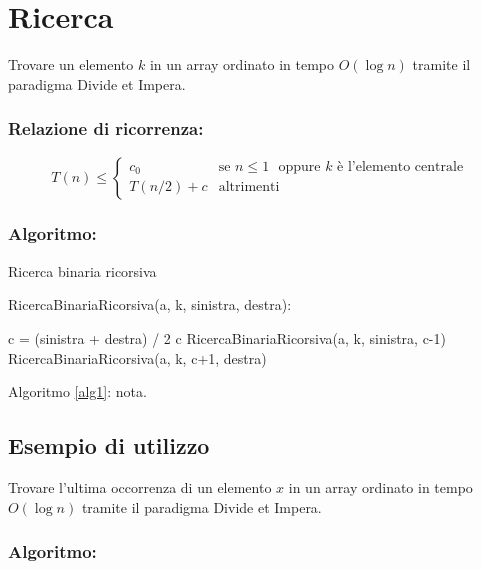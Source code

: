 \section{Ricerca}
Trovare un elemento $k$ in un array 
ordinato in tempo $O(\log n)$ tramite il paradigma Divide et Impera.

\subsubsection*{Relazione di ricorrenza:}

$$T(n) \le
\begin{cases}
    c_0 & \text{se $n \le 1$ } \text{oppure $k$ è l'elemento centrale}\\
    T(n/2) + c & \text{altrimenti}
\end{cases} $$

\subsubsection*{Algoritmo:}

\begin{algorithm}[H]
\caption{Ricerca binaria ricorsiva}
\label{alg1}
\begin{algorithmic}[1]
\STATE RicercaBinariaRicorsiva(a, k, sinistra, destra):
\begin{ALC@g}
\ENDIF
\STATE c = (sinistra + destra) / 2
    \RETURN c
\ENDIF
{}
\ENDIF
{}
    \RETURN RicercaBinariaRicorsiva(a, k, sinistra, c-1)
\ELSE
    \RETURN RicercaBinariaRicorsiva(a, k, c+1, destra)
\ENDIF
\end{ALC@g}
\end{algorithmic}
\end{algorithm}

Algoritmo \ref{alg1}:
nota\footnotemark{}.\\
\lipsum[1]

\newpage

\subsection{Esempio di utilizzo}
Trovare l'ultima occorrenza di un elemento $x$ in un array 
ordinato in tempo $O(\log n)$ tramite il paradigma Divide et Impera.

\subsubsection*{Algoritmo:}

